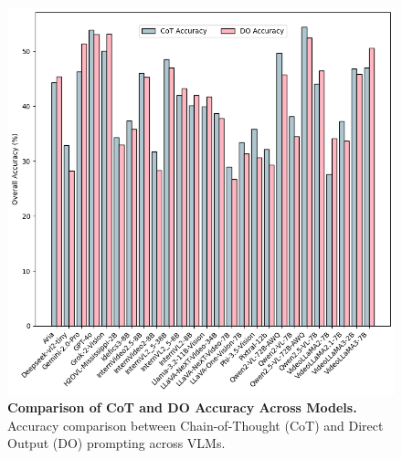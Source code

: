 \begin{figure}
    \centering
    \includegraphics[width=\linewidth]{figures/cot_vs_do.png}
    \caption{\textbf{Comparison of CoT and DO Accuracy Across Models.} Accuracy comparison between Chain-of-Thought (CoT) and Direct Output (DO) prompting across VLMs.}
    \label{fig:cot_vs_do}
    \vspace{-0.5cm}
\end{figure}

